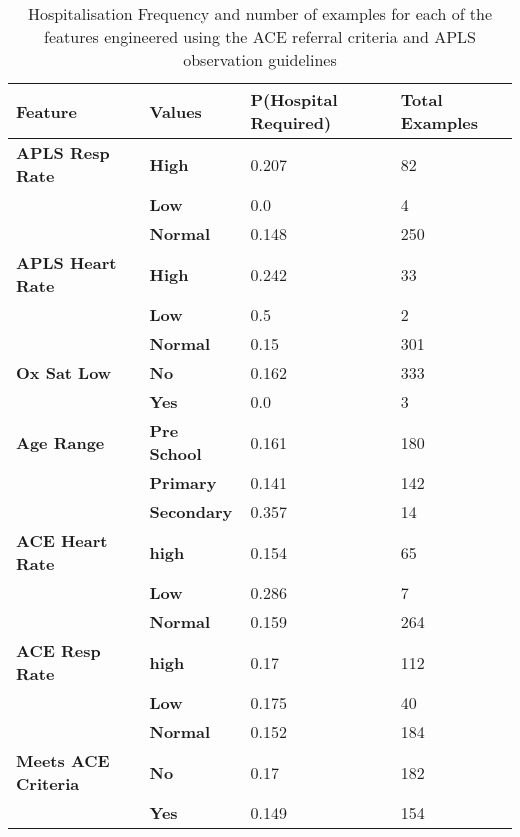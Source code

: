 \begin{table}[H]
    \scriptsize
    \centering
    \caption[Features from ACE referral criteria and APLS observation guidelines]{Hospitalisation Frequency and number of examples for each of the features engineered using the ACE referral criteria and APLS observation guidelines}
    \label{tab:extra-feature-hosp-freqs}
    \begin{tabular}{P{30mm}P{20mm}P{15mm}P{15mm}}
        \toprule
        \textbf{Feature} & \textbf{Values} & \textbf{P(Hospital Required)} & \textbf{Total Examples} \\\toprule
        \textbf{APLS Resp Rate} & \textbf{High} & 0.207 & 82 \\*
        & \textbf{Low} & 0.0 & 4 \\*
        & \textbf{Normal} & 0.148 & 250 \\[3mm]
        \textbf{APLS Heart Rate} & \textbf{High} & 0.242 & 33 \\*
        & \textbf{Low} & 0.5 & 2 \\*
        & \textbf{Normal} & 0.15 & 301 \\[3mm]
        \textbf{Ox Sat Low} & \textbf{No} & 0.162 & 333 \\*
        & \textbf{Yes} & 0.0 & 3 \\[3mm]
        \textbf{Age Range} & \textbf{Pre School} & 0.161 & 180 \\*
        & \textbf{Primary} & 0.141 & 142 \\*
        & \textbf{Secondary} & 0.357 & 14 \\[3mm]
        \textbf{ACE Heart Rate}  & \textbf{high} & 0.154 & 65 \\*
        & \textbf{Low} & 0.286 & 7 \\*
        & \textbf{Normal} & 0.159 & 264 \\[3mm]
        \textbf{ACE Resp Rate} & \textbf{high} & 0.17 & 112 \\*
        & \textbf{Low} & 0.175 & 40 \\*
        & \textbf{Normal} & 0.152 & 184 \\[3mm]
        \textbf{Meets ACE Criteria} & \textbf{No} & 0.17 & 182 \\*
        & \textbf{Yes} & 0.149 & 154\\\toprule
    \end{tabular}
\end{table}

